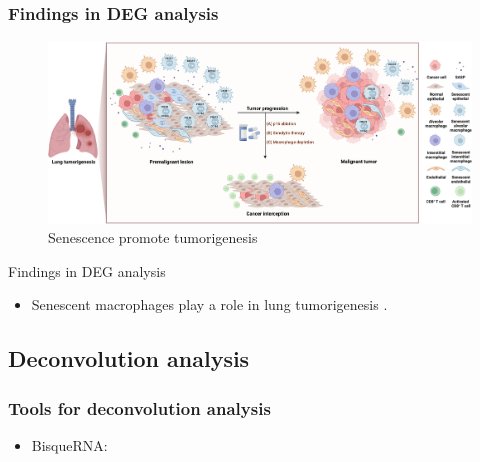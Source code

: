 \documentclass{beamer}
\begin{document}
            \begin{frame}
                \frametitle{Findings in DEG analysis}

                \begin{figure}
                    \includegraphics[width=0.6 \linewidth]{figures/LungCancer/senescent.jpg}
                    \caption{Senescence promote tumorigenesis \protect\cite{senescent-01}}
                \end{figure}

                \begin{block}{Findings in DEG analysis}
                    \begin{itemize}
                        \item Senescent macrophages play a role in lung tumorigenesis \cite{senescent-01, senescent-02, senescent-03}.
                    \end{itemize}
                \end{block}
            \end{frame}

        \subsection{Deconvolution analysis}
            \begin{frame}
                \frametitle{Tools for deconvolution analysis}

                \begin{itemize}
                    \item BisqueRNA: \cite{bisquerna-01}
                \end{itemize}
            \end{frame}
\end{document}
